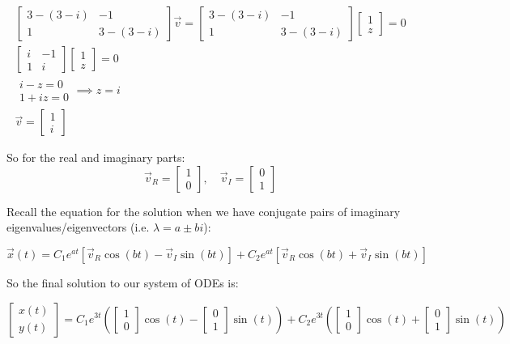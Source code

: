 \documentclass[letterpaper, fontsize=12pt]{scrartcl} %
\numberwithin{equation}{section} %
\numberwithin{figure}{section} %
\numberwithin{table}{section} %
\begin{document}
\begin{enumerate}
\begin{enumerate}[label = (\alph*)]
\begin{gather*}
\begin{bmatrix} 3 - (3 -i) & -1 \\ 1 & 3 - (3 -i) \end{bmatrix} \vec{v} = \begin{bmatrix} 3 - (3 -i) & -1 \\ 1 & 3 - (3 -i) \end{bmatrix} \begin{bmatrix} 1 \\ z \end{bmatrix} = 0 \\
\begin{bmatrix} i & -1 \\ 1 & i \end{bmatrix} \begin{bmatrix} 1 \\ z \end{bmatrix} = 0 \\
\begin{matrix} i - z = 0 \\ 1 + iz = 0 \end{matrix} \implies z = i \\
\vec{v} = \begin{bmatrix} 1 \\ i \end{bmatrix}
\end{gather*}

So for the real and imaginary parts:
\[ \vec{v}_R = \begin{bmatrix} 1 \\ 0 \end{bmatrix}, \quad \vec{v}_I = \begin{bmatrix} 0 \\ 1 \end{bmatrix} \]

Recall the equation for the solution when we have conjugate pairs of imaginary eigenvalues/eigenvectors (i.e. $\lambda = a \pm bi$):

\[ \vec{x}(t) = C_1 e^{at} \left[ \vec{v}_R \cos(bt) - \vec{v}_I \sin(bt)\right] + C_2 e^{at} \left[ \vec{v}_R \cos(bt) + \vec{v}_I \sin(bt)\right]  \]

So the final solution to our system of ODEs is:

\[ \begin{bmatrix} x(t) \\ y(t) \end{bmatrix} = C_1 e^{3t} \left( \begin{bmatrix} 1 \\ 0 \end{bmatrix} \cos(t) - \begin{bmatrix} 0 \\ 1 \end{bmatrix}\sin(t)\right) + C_2 e^{3t} \left( \begin{bmatrix} 1 \\ 0 \end{bmatrix} \cos(t) + \begin{bmatrix} 0 \\ 1 \end{bmatrix} \sin(t)\right)  \]


\end{enumerate}
\end{enumerate}
\end{document}
